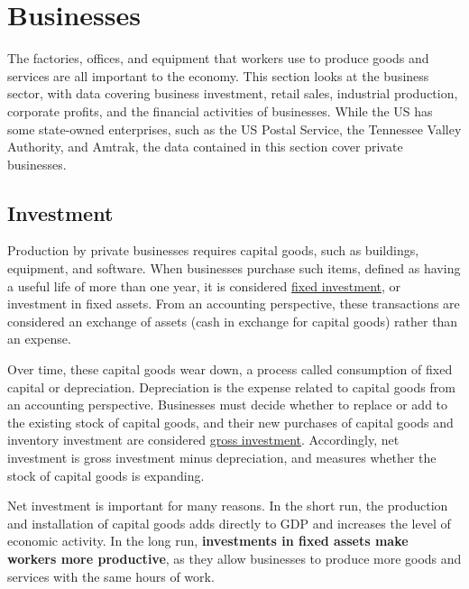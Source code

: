 \documentclass{report}
\begin{document}
{\begin{minipage}{0.76\textwidth}
\section*{\color{darkgray}\LARGE Businesses}
\label{sec:bus}
\small The factories, offices, and equipment that workers use to produce goods and services are all important to the economy. This section looks at the business sector, with data covering business investment, retail sales, industrial production, corporate profits, and the financial activities of businesses. While the US has some state-owned enterprises, such as the US Postal Service, the Tennessee Valley Authority, and Amtrak, the data contained in this section cover private businesses. 

\subsection*{\color{black!70} \seriffont Investment}
\small Production by private businesses requires capital goods, such as buildings, equipment, and software. When businesses purchase such items, defined as having a useful life of more than one year, it is considered \href{https://www.bea.gov/help/glossary/nonresidential-fixed-investment}{fixed investment}, or investment in fixed assets. From an accounting perspective, these transactions are considered an exchange of assets (cash in exchange for capital goods) rather than an expense.

Over time, these capital goods wear down, a process called consumption of fixed capital or depreciation. Depreciation is the expense related to capital goods from an accounting perspective. Businesses must decide whether to replace or add to the existing stock of capital goods, and their new purchases of capital goods and inventory investment are considered \href{https://www.bea.gov/help/glossary/gross-private-domestic-investment}{gross investment}. Accordingly, net investment is gross investment minus depreciation, and measures whether the stock of capital goods is expanding.

Net investment is important for many reasons. In the short run, the production and installation of capital goods adds directly to GDP and increases the level of economic activity. In the long run, \textbf{investments in fixed assets make workers more productive}, as they allow businesses to produce more goods and services with the same hours of work. 
\end{minipage}
\vspace{1mm}

}
\end{document}

